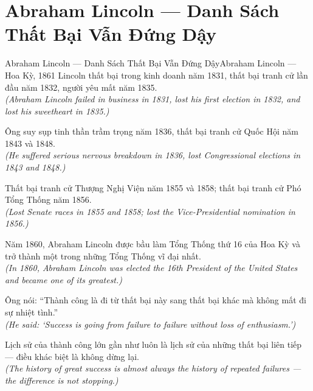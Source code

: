 \section{Abraham Lincoln --- Danh Sách Thất Bại Vẫn Đứng Dậy}
\begin{truyen}{Abraham Lincoln --- Danh Sách Thất Bại Vẫn Đứng Dậy}{Abraham Lincoln --- Hoa Kỳ, 1861}
 Lincoln thất bại trong kinh doanh năm 1831, thất bại tranh cử lần đầu năm 1832, người yêu mất năm 1835.\\[4pt]
\textit{(Abraham Lincoln failed in business in 1831, lost his first election in 1832, and lost his sweetheart in 1835.)}

Ông suy sụp tinh thần trầm trọng năm 1836, thất bại tranh cử Quốc Hội năm 1843 và 1848.\\[4pt]
\textit{(He suffered serious nervous breakdown in 1836, lost Congressional elections in 1843 and 1848.)}

Thất bại tranh cử Thượng Nghị Viện năm 1855 và 1858; thất bại tranh cử Phó Tổng Thống năm 1856.\\[4pt]
\textit{(Lost Senate races in 1855 and 1858; lost the Vice-Presidential nomination in 1856.)}

Năm 1860, Abraham Lincoln được bầu làm Tổng Thống thứ 16 của Hoa Kỳ và trở thành một trong những Tổng Thống vĩ đại nhất.\\[4pt]
\textit{(In 1860, Abraham Lincoln was elected the 16th President of the United States and became one of its greatest.)}

Ông nói: ``Thành công là đi từ thất bại này sang thất bại khác mà không mất đi sự nhiệt tình.''\\[4pt]
\textit{(He said: `Success is going from failure to failure without loss of enthusiasm.')}

\end{truyen}
\begin{baihoc}
  Lịch sử của thành công lớn gần như luôn là lịch sử của những thất bại liên tiếp --- điều khác biệt là không dừng lại.\\[4pt]
  \textit{(The history of great success is almost always the history of repeated failures --- the difference is not stopping.)}
\end{baihoc}

